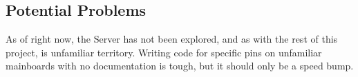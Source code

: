\subsection{Potential Problems}
As of right now, the Server has not been explored, and as with the rest of this project, is unfamiliar territory. 
Writing code for specific pins on unfamiliar mainboards with no documentation is tough, but it should only be a speed bump.

